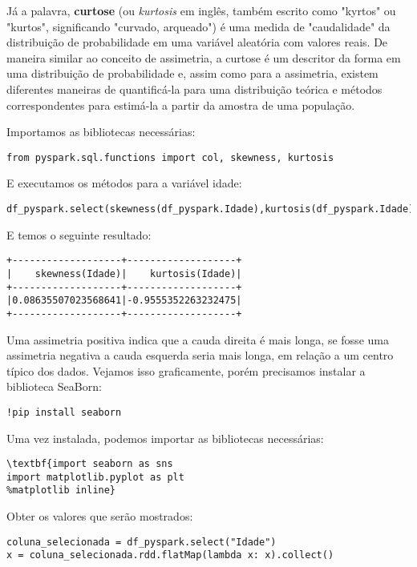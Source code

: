 Já a palavra, \textbf{curtose} (ou \textit{kurtosis} em inglês, também escrito como "kyrtos" ou "kurtos", significando "curvado, arqueado") é uma medida de "caudalidade" da distribuição de probabilidade em uma variável aleatória com valores reais. De maneira similar ao conceito de assimetria, a curtose é um descritor da forma em uma distribuição de probabilidade e, assim como para a assimetria, existem diferentes maneiras de quantificá-la para uma distribuição teórica e métodos correspondentes para estimá-la a partir da amostra de uma população.

Importamos as bibliotecas necessárias:
\begin{lstlisting}[]
from pyspark.sql.functions import col, skewness, kurtosis
\end{lstlisting}

E executamos os métodos para a variável idade:
\begin{lstlisting}[]
df_pyspark.select(skewness(df_pyspark.Idade),kurtosis(df_pyspark.Idade)).show()
\end{lstlisting}

E temos o seguinte resultado:
 \vspace{-1.5em}
\begin{verbatim}
+-------------------+-------------------+
|    skewness(Idade)|    kurtosis(Idade)|
+-------------------+-------------------+
|0.08635507023568641|-0.9555352263232475|
+-------------------+-------------------+
\end{verbatim}

Uma assimetria positiva indica que a cauda direita é mais longa, se fosse uma assimetria negativa a cauda esquerda seria mais longa, em relação a um centro típico dos dados. Vejamos isso graficamente, porém precisamos instalar a biblioteca SeaBorn:
\begin{lstlisting}[]
!pip install seaborn
\end{lstlisting}

Uma vez instalada, podemos importar as bibliotecas necessárias:
\begin{lstlisting}[]
\textbf{import seaborn as sns
import matplotlib.pyplot as plt
%matplotlib inline}
\end{lstlisting}

Obter os valores que serão mostrados:
\begin{lstlisting}[]
coluna_selecionada = df_pyspark.select("Idade")
x = coluna_selecionada.rdd.flatMap(lambda x: x).collect()
\end{lstlisting}

